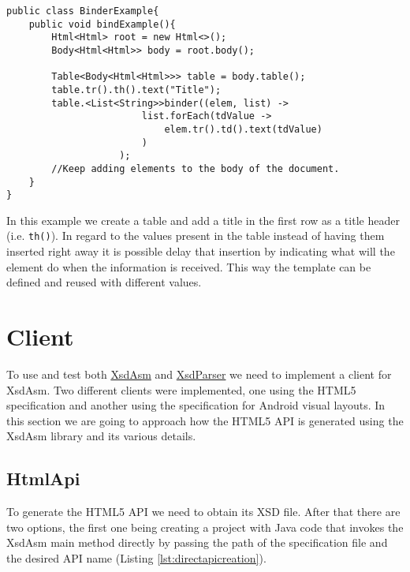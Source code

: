 \bigskip


\begin{minipage}{\linewidth}
\begin{lstlisting}[caption={Binder Usage Example},captionpos=b,label={lst:binderusage}]
public class BinderExample{
    public void bindExample(){
        Html<Html> root = new Html<>();
        Body<Html<Html>> body = root.body();
        
        Table<Body<Html<Html>>> table = body.table();
        table.tr().th().text("Title");
        table.<List<String>>binder((elem, list) ->
                        list.forEach(tdValue ->
                            elem.tr().td().text(tdValue)
                        )
                    );
        //Keep adding elements to the body of the document.
    }
}
\end{lstlisting}
\end{minipage}

\noindent
In this example we create a table and add a title in the first row as a title header (i.e. \texttt{th()}). In regard to the values present in the table instead of having them inserted right away it is possible delay that insertion by indicating what will the element do when the information is received. This way the template can be defined and reused with different values.


\section{Client} %
\label{sec:client}

To use and test both \hyperref[sec:xsdasm]{XsdAsm} and \hyperref[sec:xsdparser]{XsdParser} we need to implement a client for XsdAsm. Two different clients were implemented, one using the \ac{HTML}5 specification and another using the specification for Android visual layouts. In this section we are going to approach how the \ac{HTML}5 \ac{API} is generated using the XsdAsm library and its various details.

\subsection{HtmlApi}

To generate the \ac{HTML}5 \ac{API} we need to obtain its \ac{XSD} file. After that there are two options, the first one being creating a project with Java code that invokes the XsdAsm main method directly by passing the path of the specification file and the desired \ac{API} name (Listing \ref{lst:directapicreation}).

